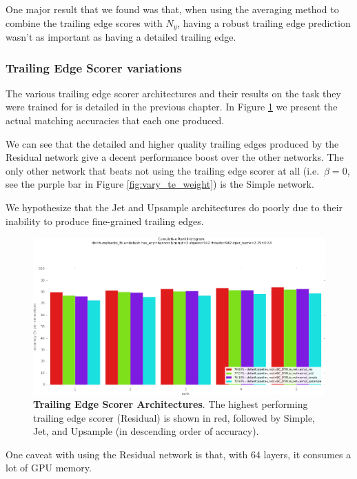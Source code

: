 One major result that we found was that, when using the averaging method to combine the trailing edge scores with $N_y$, having a robust trailing edge prediction wasn't as important as having a detailed trailing edge.


\subsubsection{Trailing Edge Scorer variations}

The various trailing edge scorer architectures and their results on the task they were trained for is detailed in the previous chapter.
In Figure \ref{fig:vary_te_scorer} we present the actual matching accuracies that each one produced.

We can see that the detailed and higher quality trailing edges produced by the Residual network give a decent performance boost over the other networks.
The only other network that beats not using the trailing edge scorer at all (i.e.\ $\beta = 0$, see the purple bar in Figure \ref{fig:vary_te_weight}) is the Simple network.

We hypothesize that the Jet and Upsample architectures do poorly due to their inability to produce fine-grained trailing edges. %

\begin{figure}[t]%
\centering
\includegraphics[width=1\textwidth]{../images/results/vary_te_scorer.png}
\caption{\textbf{Trailing Edge Scorer Architectures}. The highest performing trailing edge scorer (Residual) is shown in red, followed by Simple, Jet, and Upsample (in descending order of accuracy).}
\label{fig:vary_te_scorer}
\end{figure}

One caveat with using the Residual network is that, with 64 layers, it consumes a lot of GPU memory.

